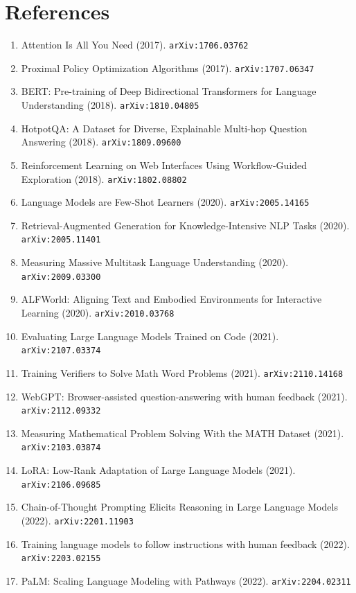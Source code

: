\documentclass[11pt]{article}
\begin{document}
\section*{References}
\begin{enumerate}\small
  \item Attention Is All You Need (2017). \texttt{arXiv:1706.03762}
  \item Proximal Policy Optimization Algorithms (2017). \texttt{arXiv:1707.06347}
  \item BERT: Pre-training of Deep Bidirectional Transformers for Language
  Understanding (2018). \texttt{arXiv:1810.04805}
  \item HotpotQA: A Dataset for Diverse, Explainable Multi-hop Question
  Answering (2018). \texttt{arXiv:1809.09600}
  \item Reinforcement Learning on Web Interfaces Using Workflow-Guided
  Exploration (2018). \texttt{arXiv:1802.08802}
  \item Language Models are Few-Shot Learners (2020). \texttt{arXiv:2005.14165}
  \item Retrieval-Augmented Generation for Knowledge-Intensive NLP Tasks (2020). \texttt{arXiv:2005.11401}
  \item Measuring Massive Multitask Language Understanding (2020). \texttt{arXiv:2009.03300}
  \item ALFWorld: Aligning Text and Embodied Environments for Interactive
  Learning (2020). \texttt{arXiv:2010.03768}
  \item Evaluating Large Language Models Trained on Code (2021). \texttt{arXiv:2107.03374}
  \item Training Verifiers to Solve Math Word Problems (2021). \texttt{arXiv:2110.14168}
  \item WebGPT: Browser-assisted question-answering with human feedback (2021). \texttt{arXiv:2112.09332}
  \item Measuring Mathematical Problem Solving With the MATH Dataset (2021). \texttt{arXiv:2103.03874}
  \item LoRA: Low-Rank Adaptation of Large Language Models (2021). \texttt{arXiv:2106.09685}
  \item Chain-of-Thought Prompting Elicits Reasoning in Large Language Models (2022). \texttt{arXiv:2201.11903}
  \item Training language models to follow instructions with human feedback (2022). \texttt{arXiv:2203.02155}
  \item PaLM: Scaling Language Modeling with Pathways (2022). \texttt{arXiv:2204.02311}

\end{enumerate}
\end{document}
